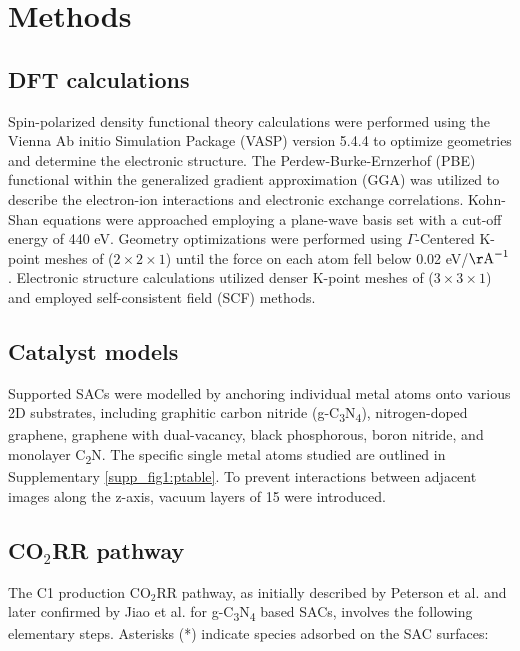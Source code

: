 
\section{Methods}
\label{main_sec_methods}

\subsection{DFT calculations}
Spin-polarized density functional theory calculations were performed using the Vienna Ab initio Simulation Package (VASP) version 5.4.4 \cite{kresse1996efficient, kresse1996efficiency, kresse1993ab} to optimize geometries and determine the electronic structure.
The Perdew-Burke-Ernzerhof (PBE) functional \cite{kresse1996efficient} within the generalized gradient approximation (GGA) \cite{perdew1996generalized} was utilized to describe the electron-ion interactions and electronic exchange correlations.
Kohn-Shan equations were approached employing a plane-wave basis set with a cut-off energy of 440 eV.
Geometry optimizations were performed using $\Gamma$-Centered K-point meshes of ($2\times2\times1$) until the force on each atom fell below 0.02 eV/\(\mathrm{\AA}^{-1}\).
Electronic structure calculations utilized denser K-point meshes of ($3\times3\times1$) and employed self-consistent field (SCF) methods.

\subsection{Catalyst models}
Supported SACs were modelled by anchoring individual metal atoms onto various 2D substrates,
including graphitic carbon nitride (g-C\textsubscript{3}N\textsubscript{4}), nitrogen-doped graphene,
graphene with dual-vacancy, black phosphorous, boron nitride, and monolayer C\textsubscript{2}N.
The specific single metal atoms studied are outlined in Supplementary \cref{supp_fig1:ptable}.
To prevent interactions between adjacent images along the z-axis, vacuum layers of 15 \text{\AA} were introduced.

\subsection{CO$_2$RR pathway}
The C1 production CO$_2$RR pathway, as initially described by Peterson et al. \cite{peterson2010copper} and later confirmed by Jiao et al. \cite{jiao2017molecular} for g-C\textsubscript{3}N\textsubscript{4} based SACs, involves the following elementary steps.
Asterisks (*) indicate species adsorbed on the SAC surfaces:


